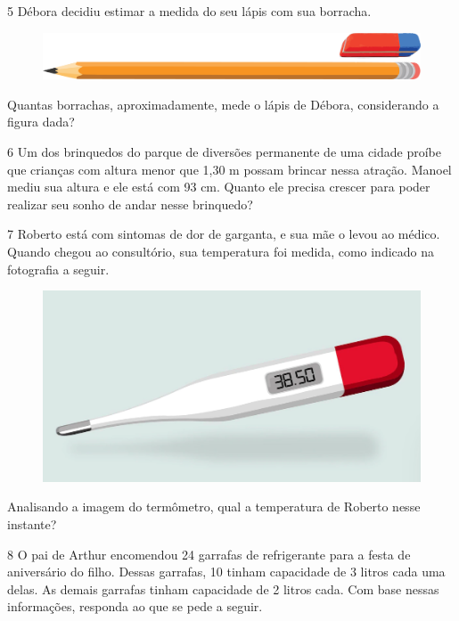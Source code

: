 \pagebreak
\num{5} Débora decidiu estimar a medida do seu lápis com sua borracha.

\begin{figure}[htpb!]
\centering
\includegraphics[width=.5\textwidth]{./media/image46.png}
\end{figure}

Quantas borrachas, aproximadamente, mede o lápis de Débora, considerando a figura dada?


\num{6} Um dos brinquedos do parque de diversões permanente de uma cidade proíbe
que crianças com altura menor que 1,30 m possam brincar nessa
atração. Manoel mediu sua altura e ele está com 93 cm. Quanto ele
precisa crescer para poder realizar seu sonho de andar nesse brinquedo?

\num{7} Roberto está com sintomas de dor de garganta, e sua mãe o levou ao
médico. Quando chegou ao consultório, sua temperatura foi medida, como indicado na fotografia a seguir.

\begin{figure}[htpb!]
\centering
\includegraphics[width=.5\textwidth]{./media/image47.png}
\end{figure}

\begin{escolha}
\item Analisando a imagem do termômetro, qual a temperatura de Roberto nesse instante?
\end{escolha}

\num{8} O pai de Arthur encomendou 24 garrafas de
refrigerante para a festa de aniversário do filho. Dessas garrafas, 10 tinham capacidade de 3 litros cada uma delas. As demais garrafas tinham capacidade de 2 litros cada. Com base nessas
informações, responda ao que se pede a seguir.

